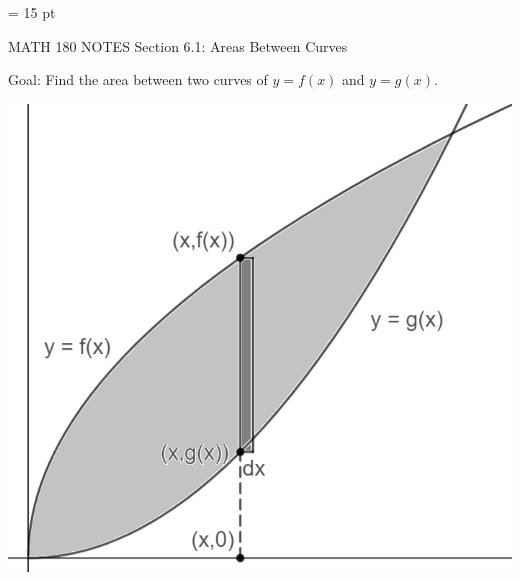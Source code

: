 \documentclass[12pt,letterpaper]{article}
\begin{document}
\thispagestyle{empty}

\baselineskip = 15 pt %


MATH 180 NOTES \hfill Section 6.1: Areas Between Curves

\hrulefill

Goal: Find the area between two curves of $y = f(x)$ and $y = g(x)$.

\includegraphics[scale=0.7]{math180_sec6_1_img1r.png}
\end{document}

